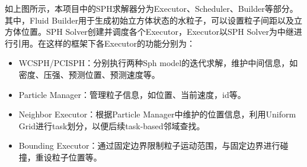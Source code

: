 如上图所示，本项目中的SPH求解器分为Executor、Scheduler、Builder等部分。其中，Fluid Builder用于生成初始立方体状态的水粒子，可以设置粒子间距以及立方体位置。SPH Solver创建并调度各个Executor，Executor以SPH Solver为中继进行引用。在这样的框架下各Executor的功能分别为：

\begin{itemize}
	\item WCSPH/PCISPH：分别执行两种Sph model的迭代求解，维护中间信息，如密度、压强、预测位置、预测速度等。
	\item Particle Manager：管理粒子信息，如位置、当前速度，id等。
	\item Neighbor Executor：根据Particle Manager中维护的位置信息，利用Uniform Grid进行task划分，以便后续task-based邻域查找。
	\item Bounding Executor：通过固定边界限制粒子运动范围，与固定边界进行碰撞，重设粒子位置等。
\end{itemize}
